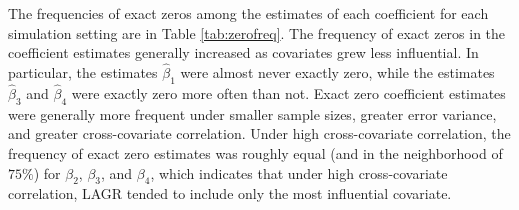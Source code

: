 \documentclass[authoryear,review, 12pt]{elsarticle}
\begin{document}
The frequencies of exact zeros among the estimates of each coefficient for each simulation setting are in Table \ref{tab:zerofreq}.
The frequency of exact zeros in the coefficient estimates generally increased as covariates grew less influential.
In particular, the estimates $\hat{\beta}_1$ were almost never exactly zero, while the estimates $\hat{\beta}_3$ and $\hat{\beta}_4$ were exactly zero more often than not.
Exact zero coefficient estimates were generally more frequent under smaller sample sizes, greater error variance, and greater cross-covariate correlation. 
Under high cross-covariate correlation, the frequency of exact zero estimates was roughly equal (and in the neighborhood of $75\%$) for $\beta_2$, $\beta_3$, and $\beta_4$, which indicates that under high cross-covariate correlation, LAGR tended to include only the most influential covariate.
\end{document}
